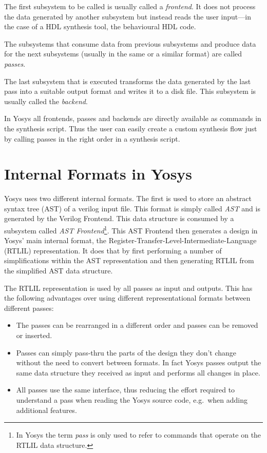 The first subsystem to be called is usually called a {\it frontend}. It does not process the data generated by
another subsystem but instead reads the user input---in the case of a HDL synthesis tool, the behavioural
HDL code.

The subsystems that consume data from previous subsystems and produce data for the next subsystems (usually in the
same or a similar format) are called {\it passes}.

The last subsystem that is executed transforms the data generated by the last pass into a suitable output
format and writes it to a disk file. This subsystem is usually called the {\it backend}.

In Yosys all frontends, passes and backends are directly available as commands in the synthesis script. Thus
the user can easily create a custom synthesis flow just by calling passes in the right order in a synthesis
script.

\section{Internal Formats in Yosys}

Yosys uses two different internal formats. The first is used to store an abstract syntax tree (AST) of a verilog
input file. This format is simply called {\it AST} and is generated by the Verilog Frontend. This data structure
is consumed by a subsystem called {\it AST Frontend}\footnote{In Yosys the term {\it pass} is only used to
refer to commands that operate on the RTLIL data structure.}. This AST Frontend then generates a design in Yosys'
main internal format, the Register-Transfer-Level-Intermediate-Language (RTLIL) representation. It does that
by first performing a number of simplifications within the AST representation and then generating RTLIL from
the simplified AST data structure.

The RTLIL representation is used by all passes as input and outputs. This has the following advantages over
using different representational formats between different passes:

\begin{itemize}
\item The passes can be rearranged in a different order and passes can be removed or inserted.
\item Passes can simply pass-thru the parts of the design they don't change without the need
      to convert between formats. In fact Yosys passes output the same data structure they received
      as input and performs all changes in place.
\item All passes use the same interface, thus reducing the effort required to understand a pass
      when reading the Yosys source code, e.g.~when adding additional features.
\end{itemize}

